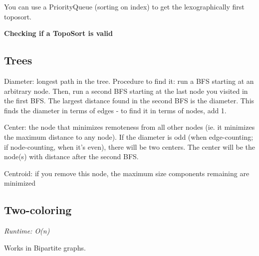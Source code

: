 You can use a PriorityQueue (sorting on index) to get the lexographically first toposort.

\textbf{Checking if a TopoSort is valid}



\subsection*{Trees}

Diameter: longest path in the tree. Procedure to find it: run a BFS starting at an arbitrary node. Then, run a second BFS starting at the last node you visited in the first BFS. The largest distance found in the second BFS is the diameter. This finds the diameter in terms of edges - to find it in terms of nodes, add 1.

Center: the node that minimizes remoteness from all other nodes (ie. it minimizes the maximum distance to any node). If the diameter is odd (when edge-counting; if node-counting, when it's even), there will be two centers. The center will be the node(s) with distance  after the second BFS.

Centroid: if you remove this node, the maximum size components remaining are minimized

\subsection*{Two-coloring}

\textit{Runtime: O(n)}

Works in Bipartite graphs.




\newpage